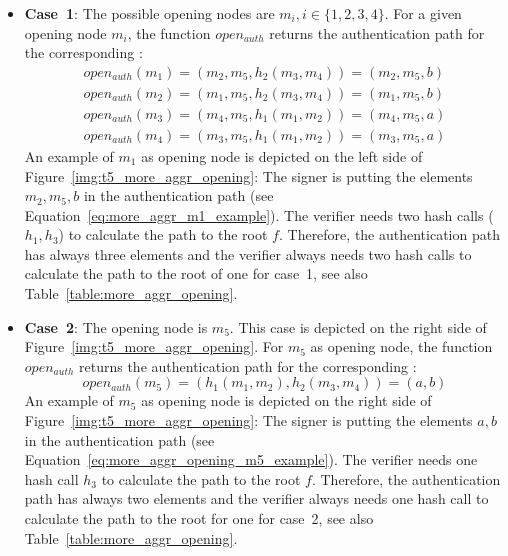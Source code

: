\begin{itemize}
\label{list:case1_case_2}
\item \textbf{Case~1}: The possible opening nodes are $m_i, i \in \{1,2,3,4\}$. For a given opening node $m_i$, the function $open_{auth}$ returns the authentication path for the corresponding \tfblock:
\begin{align}
open_{auth}(m_1) = (m_2, m_5, h_2(m_3, m_4)) = (m_2, m_5, b) \label{eq:more_aggr_m1_example} \\
open_{auth}(m_2) = (m_1, m_5, h_2(m_3, m_4)) = (m_1, m_5, b) \\
open_{auth}(m_3) = (m_4, m_5, h_1(m_1, m_2)) = (m_4, m_5, a) \\
open_{auth}(m_4) = (m_3, m_5, h_1(m_1, m_2)) = (m_3, m_5, a) \label{eq:more_aggr_m4_example}
\end{align} 
An example of $m_1$ as opening node is depicted on the left side of Figure~\ref{img:t5_more_aggr_opening}: The signer is putting the elements $m_2, m_5, b$ in the authentication path (see Equation~\ref{eq:more_aggr_m1_example}). The verifier needs two hash calls ($h_1, h_3$) to calculate the path to the root $f$.
Therefore, the authentication path has always three elements and the verifier always needs two hash calls to calculate the path to the root of one \tfblock for case~1, see also Table~\ref{table:more_aggr_opening}.

\item \textbf{Case~2}: The opening node is $m_5$. This case is depicted on the right side of Figure~\ref{img:t5_more_aggr_opening}. For $m_5$ as opening node, the function $open_{auth}$ returns the authentication path for the corresponding \tfblock:
\begin{equation}
\label{eq:more_aggr_opening_m5_example}
open_{auth}(m_5) = (h_1(m_1, m_2), h_2(m_3, m_4)) = (a, b)
\end{equation}
An example of $m_5$ as opening node is depicted on the right side of Figure~\ref{img:t5_more_aggr_opening}: The signer is putting the elements $a, b$ in the authentication path (see Equation~\ref{eq:more_aggr_opening_m5_example}). The verifier needs one hash call $h_3$ to calculate the path to the root $f$.
Therefore, the authentication path has always two elements and the verifier always needs one hash call to calculate the path to the root for one \tfblock for case~2, see also Table~\ref{table:more_aggr_opening}.
\end{itemize} 

